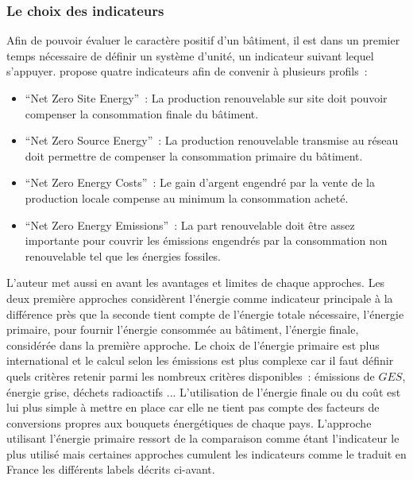 \subsubsection{Le choix des indicateurs} %
\label{ssub:le_choix_des_indicateurs}
Afin de pouvoir évaluer le caractère positif d’un bâtiment, il est dans un premier
temps nécessaire de définir un système d’unité, un indicateur suivant lequel
s’appuyer. \textcite{Torcellini2006} propose quatre indicateurs afin de convenir
à plusieurs profils~:
\begin{itemize}
    \item \enquote{Net Zero Site Energy}~: La production renouvelable sur site
          doit pouvoir compenser la consommation finale du bâtiment.
    \item \enquote{Net Zero Source Energy}~: La production renouvelable transmise au réseau
          doit permettre de compenser la consommation primaire du bâtiment.
    \item \enquote{Net Zero Energy Costs}~: Le gain d’argent engendré par la vente
           de la production locale compense au minimum la consommation acheté.
    \item \enquote{Net Zero Energy Emissions}~: La part renouvelable doit être assez
           importante pour couvrir les émissions engendrés par la consommation non
           renouvelable tel que les énergies fossiles.
\end{itemize}
L’auteur met aussi en avant les avantages et limites de chaque approches. Les
deux première approches considèrent l’énergie comme indicateur principale à la différence
près que la seconde tient compte de l’énergie totale nécessaire, l’énergie primaire, pour fournir l’énergie consommée
au bâtiment, l’énergie finale, considérée dans la première approche. Le choix
de l’énergie primaire est plus international et le calcul selon les émissions
est plus complexe car il faut définir quels critères retenir parmi les nombreux critères
disponibles~: émissions de $GES$, énergie grise, déchets radioactifs ...
L’utilisation de l’énergie finale ou du coût est lui plus simple à mettre en place
car elle ne tient pas compte des facteurs de conversions propres aux bouquets énergétiques de chaque pays.
L’approche utilisant l’énergie primaire ressort de la comparaison comme étant l’indicateur le
plus utilisé mais certaines approches cumulent les indicateurs comme le traduit en France les différents
labels décrits ci-avant.


